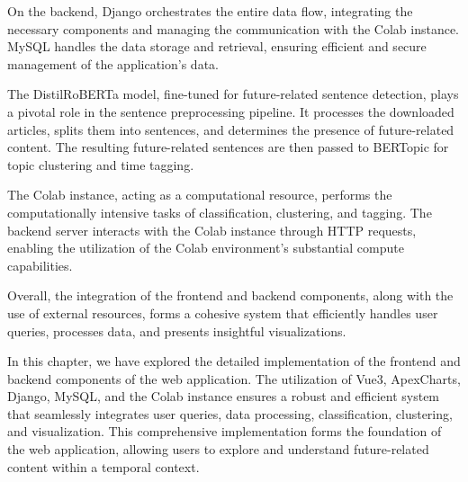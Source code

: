 \documentclass[a4paper,10pt]{report} %
\begin{document}
On the backend, Django orchestrates the entire data flow, integrating the necessary components and managing the communication with the Colab instance. MySQL handles the data storage and retrieval, ensuring efficient and secure management of the application's data.

The DistilRoBERTa model, fine-tuned for future-related sentence detection, plays a pivotal role in the sentence preprocessing pipeline. It processes the downloaded articles, splits them into sentences, and determines the presence of future-related content. The resulting future-related sentences are then passed to BERTopic for topic clustering and time tagging.

The Colab instance, acting as a computational resource, performs the computationally intensive tasks of classification, clustering, and tagging. The backend server interacts with the Colab instance through HTTP requests, enabling the utilization of the Colab environment's substantial compute capabilities.

Overall, the integration of the frontend and backend components, along with the use of external resources, forms a cohesive system that efficiently handles user queries, processes data, and presents insightful visualizations.

In this chapter, we have explored the detailed implementation of the frontend and backend components of the web application. The utilization of Vue3, ApexCharts, Django, MySQL, and the Colab instance ensures a robust and efficient system that seamlessly integrates user queries, data processing, classification, clustering, and visualization. This comprehensive implementation forms the foundation of the web application, allowing users to explore and understand future-related content within a temporal context.



\end{document}
